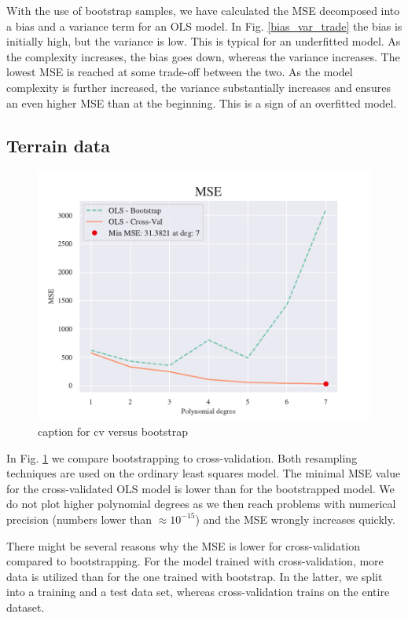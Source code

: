 With the use of bootstrap samples, we have calculated the MSE decomposed into a bias and a variance term for an OLS model. 
In Fig. \ref{bias_var_trade} the bias is initially high, but the variance is low. 
This is typical for an underfitted model. As the complexity increases, the bias goes down, whereas the variance increases. 
The lowest MSE is reached at some trade-off between the two. 
As the model complexity is further increased, the variance substantially increases and ensures an even higher MSE than at the beginning. 
This is a sign of an overfitted model.

\subsection{Terrain data}

\begin{figure}[h!]
    \centering
    \includegraphics[width=1\linewidth]{project_1/figures/figures_in_report/CV_BS_OLS_terrain.pdf}
    \caption{caption for cv versus bootstrap}
    \label{cv_versus_bs}
\end{figure}

In Fig. \ref{cv_versus_bs} we compare bootstrapping to cross-validation. 
Both resampling techniques are used on the ordinary least squares model. 
The minimal MSE value for the cross-validated OLS model is lower than for the bootstrapped model. 
We do not plot higher polynomial degrees as we then reach problems with numerical precision (numbers lower than $\approx 10^{-15}$) and the MSE wrongly increases quickly.  

There might be several reasons why the MSE is lower for cross-validation compared to bootstrapping. 
For the model trained with cross-validation, more data is utilized than for the one trained with bootstrap. 
In the latter, we split into a training and a test data set, whereas cross-validation trains on the entire dataset.

